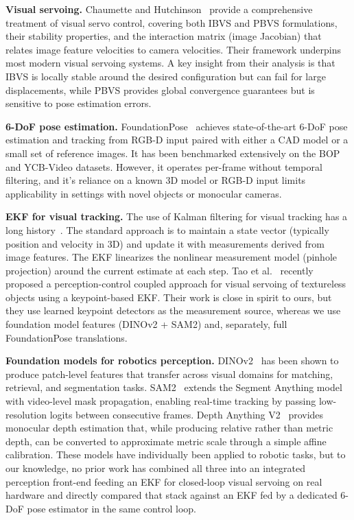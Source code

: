 \documentclass[letterpaper, 10 pt, conference]{ieeeconf}  %
\begin{document}
\textbf{Visual servoing.}
Chaumette and Hutchinson~\cite{chaumette2006} provide a comprehensive treatment of visual servo control, covering both IBVS and PBVS formulations, their stability properties, and the interaction matrix (image Jacobian) that relates image feature velocities to camera velocities. Their framework underpins most modern visual servoing systems. A key insight from their analysis is that IBVS is locally stable around the desired configuration but can fail for large displacements, while PBVS provides global convergence guarantees but is sensitive to pose estimation errors.

\textbf{6-DoF pose estimation.}
FoundationPose~\cite{foundationpose} achieves state-of-the-art 6-DoF pose estimation and tracking from RGB-D input paired with either a CAD model or a small set of reference images. It has been benchmarked extensively on the BOP and YCB-Video datasets. However, it operates per-frame without temporal filtering, and it's reliance on a known 3D model or RGB-D input limits applicability in settings with novel objects or monocular cameras.

\textbf{EKF for visual tracking.}
The use of Kalman filtering for visual tracking has a long history~\cite{thrun2005}. The standard approach is to maintain a state vector (typically position and velocity in 3D) and update it with measurements derived from image features. The EKF linearizes the nonlinear measurement model (pinhole projection) around the current estimate at each step. Tao et al.~\cite{tao2026perceptioncontrol} recently proposed a perception-control coupled approach for visual servoing of textureless objects using a keypoint-based EKF. Their work is close in spirit to ours, but they use learned keypoint detectors as the measurement source, whereas we use foundation model features (DINOv2 + SAM2) and, separately, full FoundationPose translations.

\textbf{Foundation models for robotics perception.}
DINOv2~\cite{dinov2} has been shown to produce patch-level features that transfer across visual domains for matching, retrieval, and segmentation tasks. SAM2~\cite{sam2} extends the Segment Anything model with video-level mask propagation, enabling real-time tracking by passing low-resolution logits between consecutive frames. Depth Anything V2~\cite{depthanything} provides monocular depth estimation that, while producing relative rather than metric depth, can be converted to approximate metric scale through a simple affine calibration. These models have individually been applied to robotic tasks, but to our knowledge, no prior work has combined all three into an integrated perception front-end feeding an EKF for closed-loop visual servoing on real hardware and directly compared that stack against an EKF fed by a dedicated 6-DoF pose estimator in the same control loop.
\end{document}
